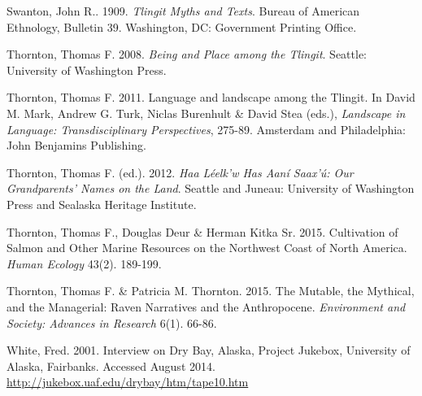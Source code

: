 \begin{hang}
Swanton, John R.. 1909. \textit{Tlingit Myths and Texts}. Bureau of American Ethnology, Bulletin 39. Washington, DC: Government Printing Office.

Thornton, Thomas F.   2008.	\textit{Being and Place among the Tlingit}.  Seattle: University of Washington Press.

Thornton, Thomas F. 2011.  Language and landscape among the Tlingit. In   David M. Mark, Andrew G. Turk, Niclas Burenhult \& David Stea (eds.), \textit{Landscape in Language: Transdisciplinary Perspectives}, 275-89. Amsterdam and Philadelphia: John Benjamins Publishing.

Thornton, Thomas F. (ed.). 2012.	\textit{Haa Léelk'w Has Aaní Saax'ú: Our Grandparents’ Names on the Land}. Seattle and Juneau: University of Washington Press and Sealaska Heritage Institute.

Thornton, Thomas F., Douglas Deur \& Herman Kitka Sr. 2015. Cultivation of Salmon and Other Marine Resources on the Northwest Coast of North America. \textit{Human Ecology} 43(2). 189-199.

Thornton, Thomas F. \& Patricia M. Thornton. 2015. The Mutable, the Mythical, and the Managerial: Raven Narratives and the Anthropocene. \textit{Environment and Society: Advances in Research} 6(1). 66-86.

White, Fred. 2001. Interview on Dry Bay, Alaska, Project Jukebox, University of Alaska, Fairbanks. Accessed August 2014. \url{http://jukebox.uaf.edu/drybay/htm/tape10.htm}

\end{hang}


\label{thornton-ch-end}
